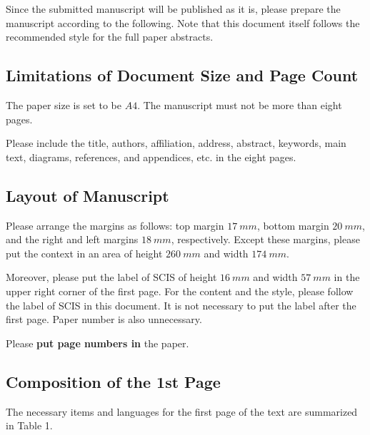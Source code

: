 \documentclass[a4paper]{article}
\begin{document}
Since the submitted manuscript will be published as it is, please prepare the manuscript according to the following.
Note that this document itself follows the recommended style for the full paper abstracts.

\subsection{Limitations of Document Size and Page Count}

The paper size is set to be $A4$. The manuscript must not be more than eight pages.

Please include the title, authors, affiliation, address, abstract, keywords, main text, diagrams, references, and appendices, etc. in the eight pages.

\subsection{Layout of Manuscript}

Please arrange the margins as follows: top margin $17~ mm$, bottom margin $20~ mm$, and the right and left margins $18~ mm$, respectively. Except these margins,
please put the context in an area of height $260~ mm$ and width $174~ mm$.

Moreover, please put the label of SCIS of height $16~ mm$ and width $57~ mm$ in the upper right corner of the first page. For the content and the style,
please follow the label of SCIS in this document. It is not necessary to put the label after the first page. Paper number is also unnecessary.

Please {\bf put page numbers in} the paper.

\subsection{Composition of the 1st Page}

The necessary items and languages for the first page of the text are summarized in Table 1.
\end{document}
